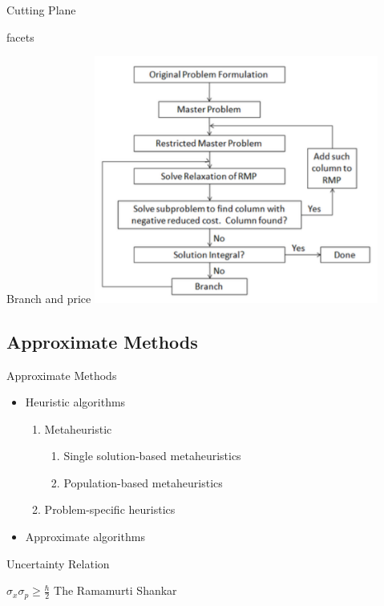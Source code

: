     \begin{frame}{Cutting Plane}
      \item facets
    \end{frame}

    \begin{frame}{Branch and price}
      \centering
      \includegraphics[width = 0.7\textwidth]{images/branch_price.png}
    \end{frame}

    \subsection{Approximate Methods}
    \frame{\sectionpage}

    \begin{frame}{Approximate Methods}
      \begin{itemize}
        \item Heuristic algorithms
        \begin{enumerate}
          \item<+->  Metaheuristic
            \begin{enumerate}
              \item<+>[*] Single solution-based metaheuristics
              \item<+>[*] Population-based metaheuristics
            \end{enumerate}
          \item<+->  Problem-specific heuristics
        \end{enumerate}
        \item<+-> Approximate algorithms
      \end{itemize}
    \end{frame}


    \begin{frame}{Uncertainty Relation}
        \begin{block}{\centering$\sigma_x\sigma_p \geq \frac{\hbar}{2}$}
            The
            \alert{Ramamurti Shankar}
        \end{block}
    \end{frame}

